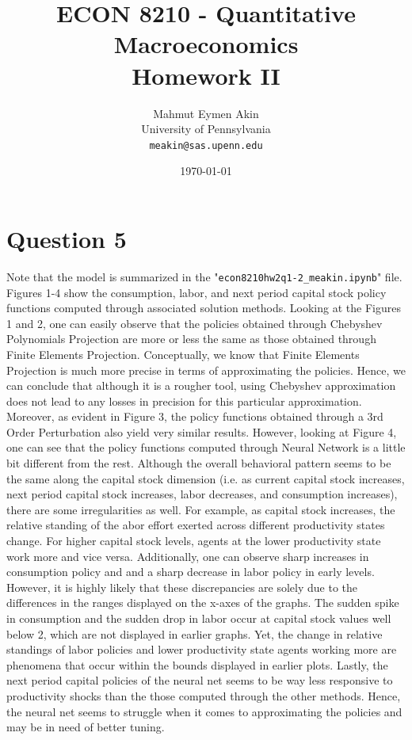 \documentclass[12pt]{article}
\theoremstyle{plain}
\theoremstyle{definition}
\theoremstyle{remark}
\begin{document}
	\title{ECON 8210 - Quantitative Macroeconomics \\ Homework II}
	\author{Mahmut Eymen Akin \\
		University of Pennsylvania \\
		\texttt{meakin@sas.upenn.edu}}
	\date{\today}
	\maketitle
	
	\section*{Question 5}
	
	Note that the model is summarized in the "\texttt{econ8210hw2q1-2\_meakin.ipynb}" file. Figures 1-4 show the consumption, labor, and next period capital stock policy functions computed through associated solution methods. Looking at the Figures 1 and 2, one can easily observe that the policies obtained through Chebyshev Polynomials Projection are more or less the same as those obtained through Finite Elements Projection. Conceptually, we know that Finite Elements Projection is much more precise in terms of approximating the policies. Hence, we can conclude that although it is a rougher tool, using Chebyshev approximation does not lead to any losses in precision for this particular approximation. Moreover, as evident in Figure 3, the policy functions obtained through a 3rd Order Perturbation also yield very similar results. However, looking at Figure 4, one can see that the policy functions computed through Neural Network is a little bit different from the rest. Although the overall behavioral pattern seems to be the same along the capital stock dimension (i.e. as current capital stock increases, next period capital stock increases, labor decreases, and consumption increases), there are some irregularities as well. For example, as capital stock increases, the relative standing of the abor effort exerted across different productivity states change. For higher capital stock levels, agents at the lower productivity state work more and vice versa. Additionally, one can observe sharp increases in consumption policy and and a sharp decrease in labor policy in early levels. However, it is highly likely that these discrepancies are solely due to the differences in the ranges displayed on the x-axes of the graphs. The sudden spike in consumption and the sudden drop in labor occur at capital stock values well below 2, which are not displayed in earlier graphs. Yet, the change in relative standings of labor policies and lower productivity state agents working more are phenomena that occur within the bounds displayed in earlier plots. Lastly, the next period capital policies of the neural net seems to be way less responsive to productivity shocks than the those computed through the other methods. Hence, the neural net seems to struggle when it comes to approximating the policies and may be in need of better tuning. 
	
\end{document}
